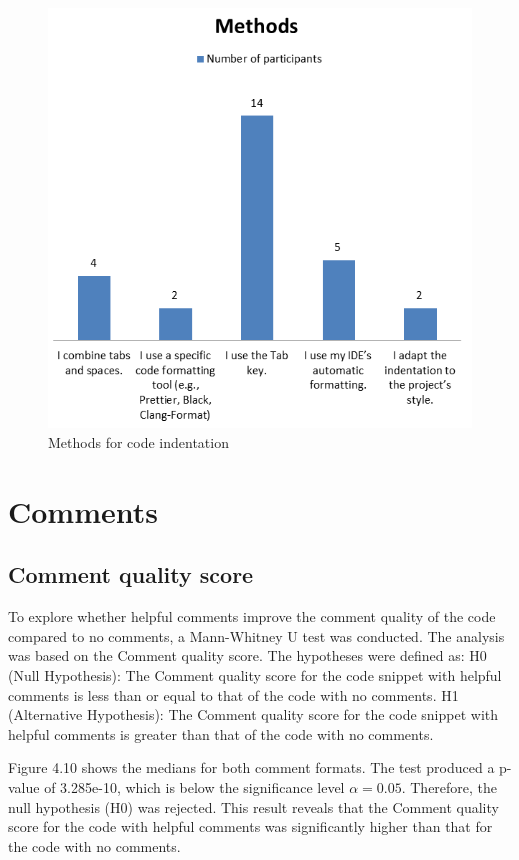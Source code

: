 \begin{figure} [H]
  \centering
  \includegraphics[scale=0.7]{figures/inM.png}
  \caption{Methods for code indentation}
  \label{fig:AnhangsChor}
\end{figure}



\section{Comments}

\subsection{Comment quality score}

To explore whether helpful comments improve the comment quality of the code compared to no comments, a Mann-Whitney U test was conducted.  The analysis was based on the Comment quality score. The hypotheses were defined as: H0 (Null Hypothesis): The Comment quality score for the code snippet with helpful comments is less than or equal to that of the code with no comments.  H1 (Alternative Hypothesis): The Comment quality score for the code snippet with helpful comments is greater than that of the code with no comments.

Figure 4.10 shows the medians for both comment formats.
The test produced a p-value of 3.285e-10, which is below the significance level $\alpha = 0.05$. Therefore, the null hypothesis (H0) was rejected. This result reveals that the Comment quality score for the code with helpful comments was significantly higher than that for the code with no comments.

